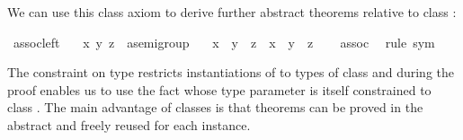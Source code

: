 \begin{isabellebody}
\begin{isamarkuptext}
We can use this class axiom to derive further abstract theorems
relative to class :%
\end{isamarkuptext}%
\isamarkuptrue%
\isamarkupfalse%
\ assoc{\isacharunderscore}left{\isacharcolon}\isanewline
\ \ \ x\ y\ z\ {\isacharcolon}{\isacharcolon}\ {\isachardoublequoteopen}{\isacharprime}a{\isasymColon}semigroup{\isachardoublequoteclose}\isanewline
\ \ \ {\isachardoublequoteopen}x\ {\isasymoplus}\ {\isacharparenleft}y\ {\isasymoplus}\ z{\isacharparenright}\ {\isacharequal}\ {\isacharparenleft}x\ {\isasymoplus}\ y{\isacharparenright}\ {\isasymoplus}\ z{\isachardoublequoteclose}\isanewline
%
\isadelimproof
\ \ %
\endisadelimproof
%
\isatagproof
{}\isamarkupfalse%
\ assoc\ \isamarkupfalse%
\ {\isacharparenleft}rule\ sym{\isacharparenright}%
\endisatagproof
{\isafoldproof}%
%
\isadelimproof
%
\endisadelimproof
%
\begin{isamarkuptext}%
\noindent The  constraint on type  restricts instantiations of  to types of class
 and during the proof enables us to use the fact
\hyperlink{fact.assoc}{\mbox{}} whose type parameter is itself constrained to class
.  The main advantage of classes is that theorems
can be proved in the abstract and freely reused for each instance.


\end{isamarkuptext}
\end{isabellebody}

